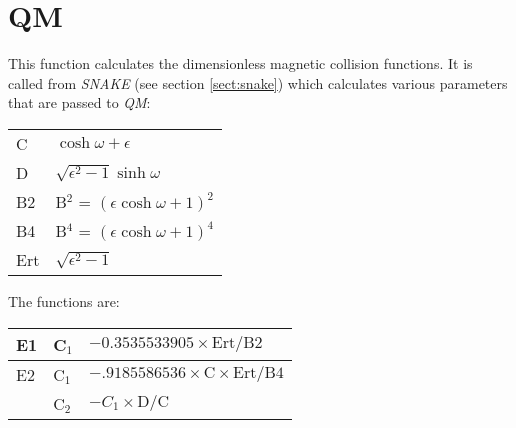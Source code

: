 \section{QM}
\label{sect:qm}

\noindent This function calculates the dimensionless magnetic
collision functions. It is called from {\em SNAKE} (see section
\ref{sect:snake}) which calculates various parameters that are passed
to {\em QM}:\\

\begin{tabular}{ll}
C & $\cosh\omega + \epsilon$\\
D & $\sqrt{\epsilon^2 - 1} \sinh\omega$\\
B2 & B$^2$ = $(\epsilon \cosh\omega + 1)^2$\\
B4 & B$^4$ = $(\epsilon \cosh\omega + 1)^4$\\
Ert & $\sqrt{\epsilon^2 - 1}$\\
\end{tabular}

\noindent The functions are:\\

\begin{tabular}{|l|l|l|}
\hline
E1 & C$_1$ & $-0.3535533905 \times \mathrm{Ert} / \mathrm{B2}$\\
\hline
E2 & C$_1$ & $-.9185586536 \times \mathrm{C} \times \mathrm{Ert}/\mathrm{B4}$\\
   & C$_2$ & $-C_1 \times \mathrm{D} / \mathrm{C}$\\
\hline
\end{tabular}
